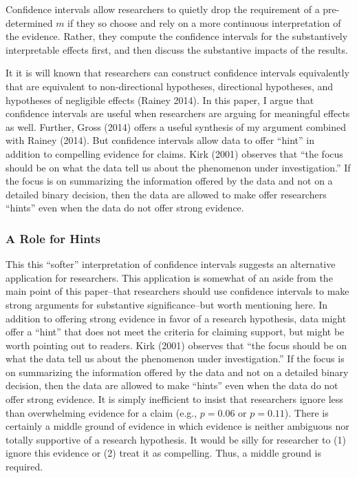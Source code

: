 \documentclass[12pt]{article}
\begin{document}
Confidence intervals allow researchers to quietly drop the requirement of a pre-determined $m$ if they so choose and rely on a more continuous interpretation of the evidence. Rather, they compute the confidence intervals for the substantively interpretable effects first, and then discuss the substantive impacts of the results.

It it is will known that researchers can construct confidence intervals equivalently that are equivalent to non-directional hypotheses, directional hypotheses, and hypotheses of negligible effects (Rainey 2014). In this paper, I argue that confidence intervals are useful when researchers are arguing for meaningful effects as well. Further, Gross (2014) offers a useful synthesis of my argument combined with Rainey (2014). But confidence intervals allow data to offer ``hint'' in addition to compelling evidence for claims. Kirk (2001) observes that ``the focus should be on what the data tell us about the phenomenon under investigation.'' If the focus is on summarizing the information offered by the data and not on a detailed binary decision, then the data are allowed to make offer researchers ``hints'' even when the data do not offer strong evidence.

\subsubsection*{A Role for Hints}

This this ``softer'' interpretation of confidence intervals suggests an alternative application for researchers. This application is somewhat of an aside from the main point of this paper--that researchers should use confidence intervals to make strong arguments for substantive significance--but worth mentioning here. In addition to offering strong evidence in favor of a research hypothesis, data might offer a ``hint'' that does not meet the criteria for claiming support, but might be worth pointing out to readers. Kirk (2001) observes that ``the focus should be on what the data tell us about the phenomenon under investigation.'' If the focus is on summarizing the information offered by the data and not on a detailed binary decision, then the data are allowed to make ``hints'' even when the data do not offer strong evidence. It is simply inefficient to insist that researchers ignore less than overwhelming evidence for a claim (e.g., $p = 0.06$ or $p = 0.11$). There is certainly a middle ground of evidence in which evidence is neither ambiguous nor totally supportive of a research hypothesis. It would be silly for researcher to (1) ignore this evidence or (2) treat it as compelling. Thus, a middle ground is required. 
\end{document}
